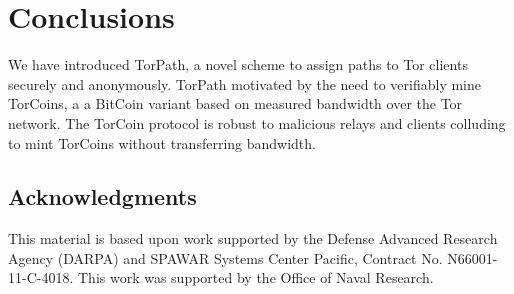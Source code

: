 \section{Conclusions} \label{conc}

We have introduced TorPath, a novel scheme to assign paths to Tor
clients securely and anonymously.
TorPath motivated by the need to verifiably mine TorCoins, a
a BitCoin variant based on measured bandwidth over the Tor network.
The TorCoin protocol is robust to malicious relays and clients
colluding to mint TorCoins without transferring bandwidth.


\subsection*{Acknowledgments}

This material is based upon work supported by the Defense Advanced Research
Agency (DARPA) and SPAWAR Systems Center Pacific, Contract No. N66001-11-C-4018.
This work was supported by the Office of Naval Research.

